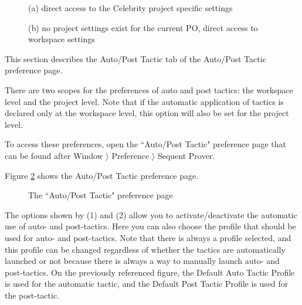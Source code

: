 \begin{figure}
\begin{minipage}[t]{.45\linewidth}
 \centering {}
 \caption{(a) direct access to the Celebrity project specific settings}
 \label{fig_ref_01_proving_perspective13}
\end{minipage}\hfill
\begin{minipage}[t]{.45\linewidth}
\centering {}
\caption{(b) no project settings exist for the current PO, direct access to workspace settings}
 \label{fig_ref_01_proving_perspective14}
\end{minipage}
\end{figure}

This section describes the \textsf{Auto/Post Tactic} tab of the \textsf{Auto/Post Tactic} preference page.

There are two scopes for the preferences of auto and post tactics: the workspace level and the project level. Note that if the automatic application of tactics is declared only at the workspace level, this option will also be set for the project level.

To access these preferences, open the ``Auto/Post Tactic" preference page that can be found after \textsf{Window $\rangle$ Preference $\rangle$ Sequent Prover}.

Figure \ref{fig_ref_01_preferences7} shows the \textsf{Auto/Post Tactic} preference page.

\begin{figure}[!ht]
\begin{center}
	\caption{The ``Auto/Post Tactic" preference page}
	\label{fig_ref_01_preferences7}
\end{center}
\end{figure}

The options shown by (1) and (2) allow you to activate/deactivate the automatic use of auto- and post-tactics. Here you can also choose the profile that should be used for auto- and post-tactics. Note that there is always a profile selected, and this profile can be changed regardless of whether the tactics are automatically launched or not because there is always a way to manually launch auto- and post-tactics. On the previously referenced figure, the \textsf{Default Auto Tactic Profile} is used for the automatic tactic, and the \textsf{Default Post Tactic Profile} is used for the post-tactic.


